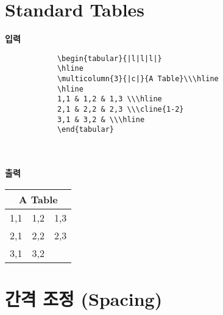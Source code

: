 \documentclass[12pt,a4paper]{report}
\begin{document}
	
	
\clearpage
\section{Standard Tables}
\null
	
	
	\singlespacing
	\textbf{입력}\\
		\begin{boxedminipage}[t]{1.0\linewidth}
		\small
		\begin{verbatim}
			\begin{tabular}{|l|l|l|}
			\hline
			\multicolumn{3}{|c|}{A Table}\\\hline
			\hline
			1,1 & 1,2 & 1,3 \\\hline
			2,1 & 2,2 & 2,3 \\\cline{1-2}
			3,1 & 3,2 & \\\hline
			\end{tabular}
		\end{verbatim} 
		\end{boxedminipage} \\ \\
			
	\textbf{출력}\\
	
		\begin{tabular}{|l|l|l|}
		\hline
		\multicolumn{3}{|c|}{A Table}\\\hline
		\hline
		1,1 & 1,2 & 1,3 \\\hline
		2,1 & 2,2 & 2,3 \\\cline{1-2}
		3,1 & 3,2 & \\\hline
		\end{tabular}

	\doublespacing





\clearpage
\section{간격 조정 (Spacing)}
\null
	
	
\end{document}
